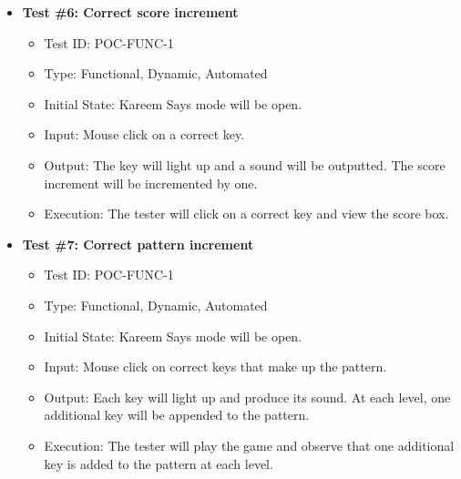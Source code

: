 \documentclass[12pt, titlepage]{article}
\begin{document}
\begin{itemize}

\item \textbf{Test \#6: Correct score increment}
\begin{itemize}
\item Test ID: POC-FUNC-1
\item Type: Functional, Dynamic, Automated  		
\item Initial State: Kareem Says mode will be open. 					
\item Input: Mouse click on a correct key.  					
\item Output: The key will light up and a sound will be outputted. The score increment will be incremented by one.				
\item Execution: The tester will click on a correct key and view the score box.  
\end{itemize}

\item \textbf{Test \#7: Correct pattern increment}
\begin{itemize}
\item Test ID: POC-FUNC-1
\item Type: Functional, Dynamic, Automated		
\item Initial State: Kareem Says mode will be open.					
\item Input: Mouse click on correct keys that make up the pattern. 		
\item Output: Each key will light up and produce its sound. At each level, one additional key will be appended to the pattern. 			
\item Execution: The tester will play the game and observe that one additional key is added to the pattern at each level.
\end{itemize}



\end{itemize}

	
\end{document}
